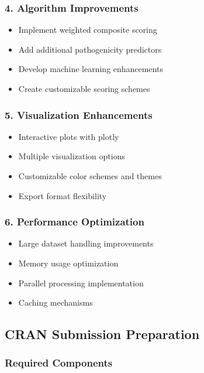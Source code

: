 \documentclass[
  11pt,
]{article}
\providecommand{\tightlist}{%
  \setlength{\itemsep}{0pt}\setlength{\parskip}{0pt}}
\begin{document}
\subsubsection{4. Algorithm Improvements}\label{algorithm-improvements}

\begin{itemize}
\tightlist
\item
  Implement weighted composite scoring
\item
  Add additional pathogenicity predictors
\item
  Develop machine learning enhancements
\item
  Create customizable scoring schemes
\end{itemize}

\subsubsection{5. Visualization
Enhancements}\label{visualization-enhancements}

\begin{itemize}
\tightlist
\item
  Interactive plots with plotly
\item
  Multiple visualization options
\item
  Customizable color schemes and themes
\item
  Export format flexibility
\end{itemize}

\subsubsection{6. Performance
Optimization}\label{performance-optimization}

\begin{itemize}
\tightlist
\item
  Large dataset handling improvements
\item
  Memory usage optimization
\item
  Parallel processing implementation
\item
  Caching mechanisms
\end{itemize}

\subsection{CRAN Submission
Preparation}\label{cran-submission-preparation}

\subsubsection{Required Components}\label{required-components}
\end{document}
